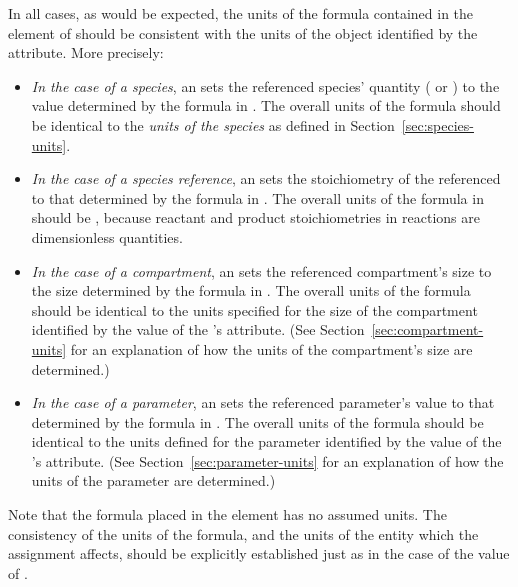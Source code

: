 In all cases, as would be expected, the units of the formula
contained in the  element of
\EventAssignment should be consistent with the units of the object
identified by the  attribute.  More
precisely:
\begin{itemize}
  
\item \emph{In the case of a species}, an \EventAssignment sets
  the referenced species' quantity ( or
  ) to the value determined by the
  formula in .  The overall units of the 
  formula should be identical to the \emph{units of the species}
  as defined in Section~\ref{sec:species-units}.
  
\item \emph{In the case of a species reference}, an
  \EventAssignment sets the stoichiometry of the referenced
  \SpeciesReference to that determined by the formula in
  .  The overall units of the formula in 
  should be , because reactant and product
  stoichiometries in reactions are dimensionless quantities.

\item \emph{In the case of a compartment}, an \EventAssignment
  sets the referenced compartment's size to the size determined by
  the formula in .  The overall units of the formula
  should be identical to the units specified for the size of the
  compartment identified by the value of the \EventAssignment's
   attribute.  (See
  Section~\ref{sec:compartment-units} for an explanation of how
  the units of the compartment's size are determined.)
  
\item \emph{In the case of a parameter}, an \EventAssignment sets
  the referenced parameter's value to that determined by the
  formula in .  The overall units of the formula should
  be identical to the units defined for the parameter identified
  by the value of the \EventAssignment's 
  attribute.  (See Section~\ref{sec:parameter-units} for
  an explanation of how the units of the parameter are
  determined.)

\end{itemize}

Note that the formula placed in the  element has no
assumed units.  The consistency of the units of the formula, and
the units of the entity which the assignment affects, should be
explicitly established just as in the case of the value of
.


